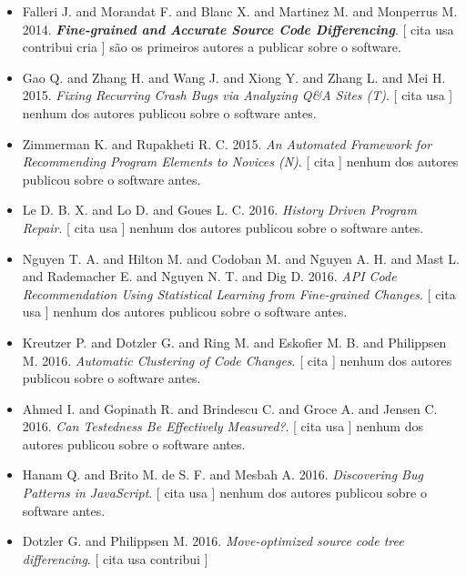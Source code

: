 \begin{itemize}
\item Falleri J. and Morandat F. and Blanc X. and Martinez M. and Monperrus M.
      2014.
        \textbf{\textit{ Fine-grained and Accurate Source Code Differencing}}.
      [
          cita
          usa
          contribui
          cria
      ]
são os primeiros autores a publicar sobre o software.
\item Gao Q. and Zhang H. and Wang J. and Xiong Y. and Zhang L. and Mei H.
      2015.
        \textit{ Fixing Recurring Crash Bugs via Analyzing Q\&A Sites (T)}.
      [
          cita
          usa
      ]
nenhum dos autores publicou sobre o software antes.
\item Zimmerman K. and Rupakheti R. C.
      2015.
        \textit{ An Automated Framework for Recommending Program Elements to Novices (N)}.
      [
          cita
      ]
nenhum dos autores publicou sobre o software antes.
\item Le D. B. X. and Lo D. and Goues L. C.
      2016.
        \textit{ History Driven Program Repair}.
      [
          cita
          usa
      ]
nenhum dos autores publicou sobre o software antes.
\item Nguyen T. A. and Hilton M. and Codoban M. and Nguyen A. H. and Mast L. and Rademacher E. and Nguyen N. T. and Dig D.
      2016.
        \textit{ API Code Recommendation Using Statistical Learning from Fine-grained Changes}.
      [
          cita
          usa
      ]
nenhum dos autores publicou sobre o software antes.
\item Kreutzer P. and Dotzler G. and Ring M. and Eskofier M. B. and Philippsen M.
      2016.
        \textit{ Automatic Clustering of Code Changes}.
      [
          cita
      ]
nenhum dos autores publicou sobre o software antes.
\item Ahmed I. and Gopinath R. and Brindescu C. and Groce A. and Jensen C.
      2016.
        \textit{ Can Testedness Be Effectively Measured?}.
      [
          cita
          usa
      ]
nenhum dos autores publicou sobre o software antes.
\item Hanam Q. and Brito M. de S. F. and Mesbah A.
      2016.
        \textit{ Discovering Bug Patterns in JavaScript}.
      [
          cita
          usa
      ]
nenhum dos autores publicou sobre o software antes.
\item Dotzler G. and Philippsen M.
      2016.
        \textit{ Move-optimized source code tree differencing}.
      [
          cita
          usa
          contribui
      ]

\end{itemize}
